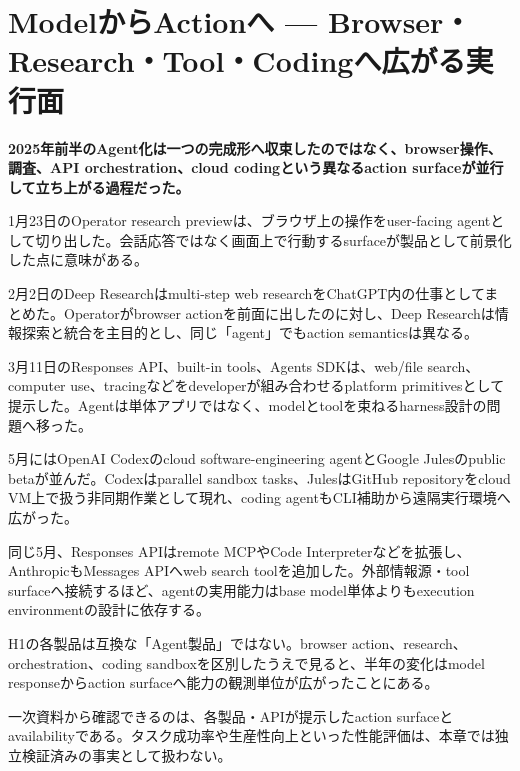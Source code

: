 \section{ModelからActionへ — Browser・Research・Tool・Codingへ広がる実行面}
\label{pkg:agents}
\noindent\textbf{2025年前半のAgent化は一つの完成形へ収束したのではなく、browser操作、調査、API orchestration、cloud codingという異なるaction surfaceが並行して立ち上がる過程だった。}\autocite{src-78593f4b387f,src-8fec3ef3a97d,src-95b210494c88}

1月23日のOperator research previewは、ブラウザ上の操作をuser-facing agentとして切り出した。会話応答ではなく画面上で行動するsurfaceが製品として前景化した点に意味がある。\autocite{src-95b210494c88}


2月2日のDeep Researchはmulti-step web researchをChatGPT内の仕事としてまとめた。Operatorがbrowser actionを前面に出したのに対し、Deep Researchは情報探索と統合を主目的とし、同じ「agent」でもaction semanticsは異なる。\autocite{src-8fec3ef3a97d}


3月11日のResponses API、built-in tools、Agents SDKは、web/file search、computer use、tracingなどをdeveloperが組み合わせるplatform primitivesとして提示した。Agentは単体アプリではなく、modelとtoolを束ねるharness設計の問題へ移った。\autocite{src-78593f4b387f}


5月にはOpenAI Codexのcloud software-engineering agentとGoogle Julesのpublic betaが並んだ。Codexはparallel sandbox tasks、JulesはGitHub repositoryをcloud VM上で扱う非同期作業として現れ、coding agentもCLI補助から遠隔実行環境へ広がった。\autocite{src-8b595b787bad,src-e7aef8f1b13b}


同じ5月、Responses APIはremote MCPやCode Interpreterなどを拡張し、AnthropicもMessages APIへweb search toolを追加した。外部情報源・tool surfaceへ接続するほど、agentの実用能力はbase model単体よりもexecution environmentの設計に依存する。\autocite{src-9257c39d4172,src-e31c642d34b6}


H1の各製品は互換な「Agent製品」ではない。browser action、research、orchestration、coding sandboxを区別したうえで見ると、半年の変化はmodel responseからaction surfaceへ能力の観測単位が広がったことにある。\autocite{src-78593f4b387f,src-8fec3ef3a97d,src-95b210494c88,src-e7aef8f1b13b}


\begin{claimboundary}
一次資料から確認できるのは、各製品・APIが提示したaction surfaceとavailabilityである。タスク成功率や生産性向上といった性能評価は、本章では独立検証済みの事実として扱わない。
\end{claimboundary}
